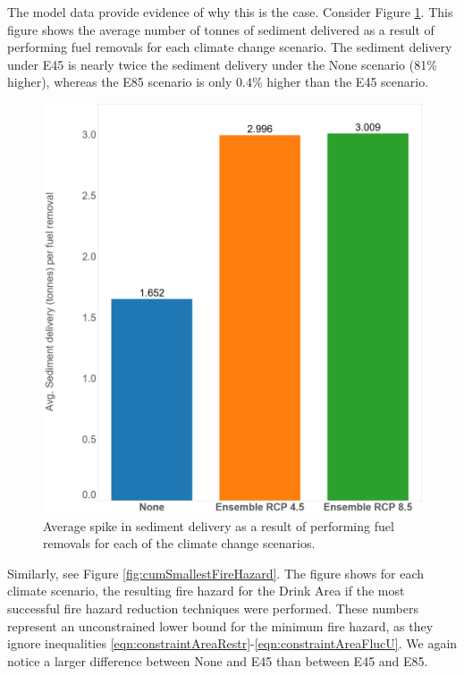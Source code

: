 The model data provide evidence of why this is the case. Consider Figure \ref{fig:avgSedimentDelivery}. This figure shows the average number of tonnes of sediment delivered as a result of performing fuel removals for each climate change scenario. The sediment delivery under E45 is nearly twice the sediment delivery under the None scenario (81\% higher), whereas the E85 scenario is only 0.4\% higher than the E45 scenario.

\begin{figure}[ht]
\centering
\includegraphics[width=.55\textwidth]{../images/AvgSedimentSpikes}
\caption[Average sediment delivery across climate scenarios]{Average spike in sediment delivery as a result of performing fuel removals for each of the climate change scenarios.}
\label{fig:avgSedimentDelivery}
\end{figure}

Similarly, see Figure \ref{fig:cumSmallestFireHazard}. The figure shows for each climate scenario, the resulting fire hazard for the Drink Area if the most successful fire hazard reduction techniques were performed. These numbers represent an unconstrained lower bound for the minimum fire hazard, as they ignore inequalities \eqref{eqn:constraintAreaRestr}-\eqref{eqn:constraintAreaFlucU}. We again notice a larger difference between None and E45 than between E45 and E85.


